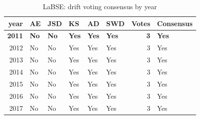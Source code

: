 \begin{table}[ht]
\centering
\caption{LaBSE: drift voting consensus by year}
\label{tab:labse_consensus}
\begin{tabular}{rlllllrl}
\toprule
year & AE & JSD & KS & AD & SWD & Votes & Consensus \\
\midrule
\textbf{2011} & \textbf{No} & \textbf{No} & \textbf{Yes} & \textbf{Yes} & \textbf{Yes} & \textbf{3} & \textbf{Yes} \\
2012 & No & No & Yes & Yes & Yes & 3 & Yes \\
2013 & No & No & Yes & Yes & Yes & 3 & Yes \\
2014 & No & No & Yes & Yes & Yes & 3 & Yes \\
2015 & No & No & Yes & Yes & Yes & 3 & Yes \\
2016 & No & No & Yes & Yes & Yes & 3 & Yes \\
2017 & No & No & Yes & Yes & Yes & 3 & Yes \\
\bottomrule
\end{tabular}
\end{table}
